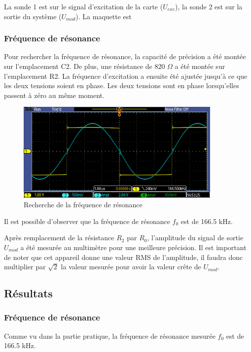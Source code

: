 La sonde 1 est sur le signal d'excitation de la carte ($U_{exc}$), la sonde 2 est sur la sortie du
système ($U_{mod}$). La maquette est 


\subsubsection{Fréquence de résonance}
Pour rechercher la fréquence de résonance, la capacité de précision a été montée sur l'emplacement C2.
De plus, une résistance de 820 $\Omega$ a été montée sur l'emplacement R2. La fréquence d'excitation 
a ensuite été ajustée jusqu'à ce que les deux tensions soient en phase. Les deux tensions sont en
phase lorsqu'elles passent à zéro au même moment.
\begin{figure}[H]
    \centering
    \includegraphics[width=10cm]{Images/Seance2/TEK00000.PNG}
    \caption{Recherche de la fréquence de résonance}
    \label{fig:freq_oscillo}
\end{figure}

Il est possible d'observer que la fréquence de résonance $f_0$ est de 166.5 kHz.
\vspace{0,2cm}

Après remplacement de la résistance $R_2$ par $R_0$, l'amplitude du signal de sortie $U_{mod}$ 
a été mesurée au multimètre pour une meilleure précision. Il est  important de noter que cet
appareil donne une valeur RMS de l'amplitude, il faudra donc multiplier par $\sqrt{2}$ la valeur
mesurée pour avoir la valeur crête de $U_{mod}$.

\subsection{Résultats}
\subsubsection{Fréquence de résonance}

Comme vu dans la partie pratique, la fréquence de résonance mesurée $f_0$ est de 166.5 kHz.

